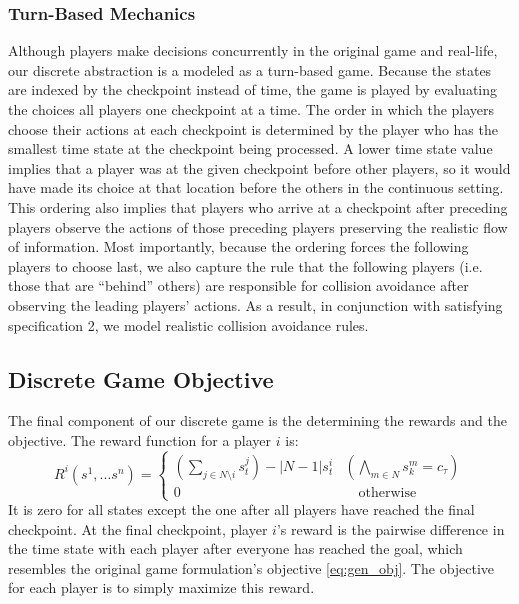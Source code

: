 \subsubsection{Turn-Based Mechanics}
Although players make decisions concurrently in the original game and real-life, our discrete abstraction is a modeled as a turn-based game. Because the states are indexed by the checkpoint instead of time, the game is played by evaluating the choices all players one checkpoint at a time. The order in which the players choose their actions at each checkpoint is determined by the player who has the smallest time state at the checkpoint being processed. A lower time state value implies that a player was at the given checkpoint before other players, so it would have made its choice at that location before the others in the continuous setting. This ordering also implies that players who arrive at a checkpoint after preceding players observe the actions of those preceding players preserving the realistic flow of information. Most importantly, because the ordering forces the following players to choose last, we also capture the rule that the following players (i.e. those that are ``behind'' others) are responsible for collision avoidance after observing the leading players' actions. As a result, in conjunction with satisfying specification 2, we model realistic collision avoidance rules. 

\subsection{Discrete Game Objective} \label{section:discobj}
The final component of our discrete game is the determining the rewards and the objective. The reward function for a player $i$ is: 
\begin{equation}
    R^i(s^1, ... s^n) = \begin{cases} 
                (\sum_{j \in N \setminus i} s^j_t) - |N-1|s^i_t & (\bigwedge_{m \in N} s^m_k   = c_\tau) \\ 
                0    & \quad \text{otherwise}
                \end{cases}
\end{equation}
It is zero for all states except the one after all players have reached the final checkpoint. At the final checkpoint, player $i$'s reward is the pairwise difference in the time state with each player after everyone has reached the goal, which resembles the original game formulation's objective \eqref{eq:gen_obj}. The objective for each player is to simply maximize this reward.

